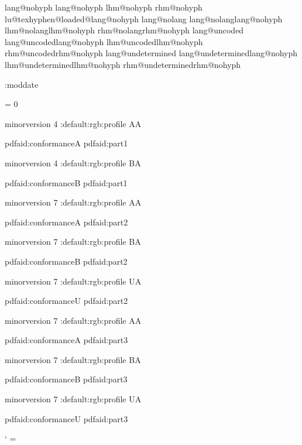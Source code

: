 

\def\newnamedlanguage#1#2#3{%
    \expandafter\newlanguage\csname lang@#1\endcsname
    \expandafter\chardef\csname lhm@#1\endcsname=#2\relax
    \expandafter\chardef\csname rhm@#1\endcsname=#3\relax
    \csname lu@texhyphen@loaded@\the\csname lang@#1\endcsname\endcsname}

\def\newnameddialect#1#2{%
    \expandafter\chardef\csname lang@#2\endcsname\csname lang@#1\endcsname
    \expandafter\chardef\csname lhm@#2\endcsname\csname lhm@#1\endcsname
    \expandafter\chardef\csname rhm@#2\endcsname\csname rhm@#1\endcsname}

\ifcsname lang@nohyph\endcsname \else
    \newnamedlanguage {nohyph} 1 1 \fi
\ifcsname lang@nolang\endcsname \else
    \newnameddialect {nohyph} {nolang} \fi
\ifcsname lang@uncoded\endcsname \else
    \newnameddialect {nohyph} {uncoded} \fi
\ifcsname lang@undetermined\endcsname \else
    \newnameddialect {nohyph} {undetermined} \fi



\newtoks\setembeddedfilesmoddate
    \setembeddedfilesmoddate{}
\newtoks\embeddedfiles:moddate
\def\minim:makedefaultmoddate{%
    \expandafter\edef\expandafter
        \minim:tmp\expandafter{\the\setembeddedfilesmoddate}%
    \embeddedfiles:moddate\expandafter{\minim:tmp}}


\newcount \pdfaconformancelevel
\pdfaconformancelevel = 0

\def\pdfalevel#1#2{%
    \global\pdfaconformancelevel=#1\relax
    \ifcsname minim:pdfa:#1#2\endcsname \lastnamedcs\else
        \errmessage{Unknown pdf/a standard pdf/a-#1}\fi}

\def\minim:pdfasettings#1#2#3{%
    \pdfvariable minorversion #1\relax
    \minim:default:rgb:profile
    \if#2A\writedocumentstructure1\fi
    
    \setmetadata pdfaid:conformance{#2}%
    \setmetadata pdfaid:part{#3}}

\expandafter\def\csname minim:pdfa:1a\endcsname{\minim:pdfasettings 4A1}
\expandafter\def\csname minim:pdfa:1b\endcsname{\minim:pdfasettings 4B1}
\expandafter\def\csname minim:pdfa:2a\endcsname{\minim:pdfasettings 7A2}
\expandafter\def\csname minim:pdfa:2b\endcsname{\minim:pdfasettings 7B2}
\expandafter\def\csname minim:pdfa:2u\endcsname{\minim:pdfasettings 7U2}
\expandafter\def\csname minim:pdfa:3a\endcsname{\minim:pdfasettings 7A3}
\expandafter\def\csname minim:pdfa:3b\endcsname{\minim:pdfasettings 7B3}
\expandafter\def\csname minim:pdfa:3u\endcsname{\minim:pdfasettings 7U3}


\catcode`\: = \minimpdfloaded


